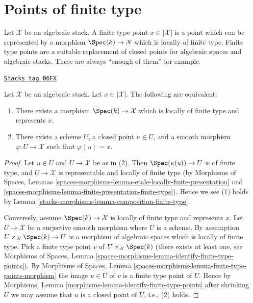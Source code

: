 \section{Points of finite type}
\label{stacks-morphisms-section-points-finite-type}
Let $\mathcal{X}$ be an algebraic stack.
A finite type point $x \in |\mathcal{X}|$ is a point which can be represented
by a morphism $\Spec(k) \to \mathcal{X}$ which is locally of finite type.
Finite type points are a suitable replacement of closed points for algebraic
spaces and algebraic stacks. There are always ``enough of them'' for example.

\begin{lemma}
\label{stacks-morphisms-lemma-point-finite-type}
\href{https://stacks.math.columbia.edu/tag/06FX}{\texttt{Stacks tag 06FX}}

Let $\mathcal{X}$ be an algebraic stack.
Let $x \in |\mathcal{X}|$. The following are equivalent:
\begin{enumerate}
\item There exists a morphism $\Spec(k) \to \mathcal{X}$
which is locally of finite type and represents $x$.
\item There exists a scheme $U$, a closed point $u \in U$, and a smooth
morphism $\varphi : U \to \mathcal{X}$ such that $\varphi(u) = x$.
\end{enumerate}
\end{lemma}

\begin{proof}
Let $u \in U$ and $U \to \mathcal{X}$ be as in (2). Then
$\Spec(\kappa(u)) \to U$ is of finite type, and $U \to \mathcal{X}$ is
representable and locally of finite type (by
Morphisms of Spaces,
Lemmas \ref{spaces-morphisms-lemma-etale-locally-finite-presentation} and
\ref{spaces-morphisms-lemma-finite-presentation-finite-type}).
Hence we see (1) holds by
Lemma \ref{stacks-morphisms-lemma-composition-finite-type}.

\medskip\noindent
Conversely, assume $\Spec(k) \to \mathcal{X}$ is locally of finite type
and represents $x$. Let $U \to \mathcal{X}$ be a surjective smooth morphism
where $U$ is a scheme. By assumption
$U \times_\mathcal{X} \Spec(k) \to U$ is a morphism of algebraic
spaces which is locally of finite type. Pick a finite type point $v$ of
$U \times_\mathcal{X} \Spec(k)$ (there exists at least one, see
Morphisms of Spaces,
Lemma \ref{spaces-morphisms-lemma-identify-finite-type-points}).
By
Morphisms of Spaces,
Lemma \ref{spaces-morphisms-lemma-finite-type-points-morphism}
the image $u \in U$ of $v$ is a finite type point of $U$.
Hence by
Morphisms, Lemma \ref{morphisms-lemma-identify-finite-type-points}
after shrinking $U$ we may assume that $u$ is a closed point of $U$, i.e.,
(2) holds.
\end{proof}

